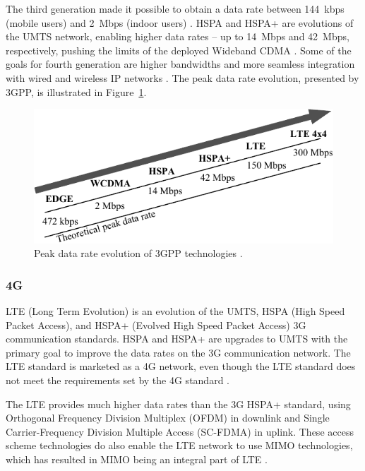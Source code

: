 The third generation made it possible to obtain a data rate between \SI{144}{kbps} (mobile users) and \SI{2}{Mbps} (indoor users) \cite{tanenbaum2012computer}. HSPA and HSPA+ are evolutions of the UMTS network, enabling higher data rates -- up to \SI{14}{Mbps} and \SI{42}{Mbps}, respectively, pushing the limits of the deployed Wideband CDMA \cite{holma2011lte}. Some of the goals for fourth generation are higher bandwidths and more seamless integration with wired and wireless IP networks \cite{tanenbaum2012computer}. The peak data rate evolution, presented by 3GPP, is illustrated in Figure~\ref{fig:3gppevo}.

\begin{figure}[htbp]
    \centering
    \includegraphics[scale=0.8]{img/analysis/3gppevo.pdf}
    \caption{Peak data rate evolution of 3GPP technologies \cite{holma2011lte}.}
    \label{fig:3gppevo}
\end{figure}


\subsubsection{4G}
LTE (Long Term Evolution) is an evolution of the UMTS, HSPA (High Speed Packet Access), and HSPA+ (Evolved High Speed Packet Access) 3G communication standards. HSPA and HSPA+ are upgrades to UMTS with the primary goal to improve the data rates on the 3G communication network. The LTE standard is marketed as a 4G network, even though the LTE standard does not meet the requirements set by the 4G standard \cite{radio2015electronics}.

The LTE provides much higher data rates than the 3G HSPA+ standard, using Orthogonal Frequency Division Multiplex (OFDM) in downlink and Single Carrier-Frequency Division Multiple Access (SC-FDMA) in uplink. These access scheme technologies do also enable the LTE network to use MIMO technologies, which has resulted in MIMO being an integral part of LTE \cite{radio2015electronics}.


